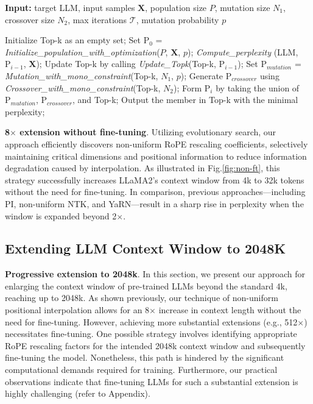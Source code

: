 \begin{algorithm}[t]
	\small
	\caption{The search algorithm}
	\textbf{Input:} target LLM, input samples $\mathbf{X}$, population size $P$, mutation size $N_1$, crossover size $N_2$, max iterations $\mathcal{T}$, mutation probability $p$\\

	\begin{algorithmic}[1]
		\label{alg:search}
		\STATE Initialize Top-k as an empty set;	
		\STATE Set $\text{P}_0$ = \textit{Initialize\_population\_with\_optimization}($P$, $\mathbf{X}$, $p$); 
		\STATE \textit{Compute\_perplexity} (LLM, $\text{P}_{i-1}$, $\mathbf{X}$);
		\STATE  Update Top-k by calling \textit{Update\_Topk}(Top-k, $\text{P}_{i-1}$);
		\STATE Set $\text{P}_{mutation}$ = \textit{Mutation\_with\_mono\_constraint}(Top-k, $N_1$, $p$); 
		\STATE Generate $\text{P}_{crossover}$ using \textit{Crossover\_with\_mono\_constraint}(Top-k, $N_2$);
		\STATE Form $\text{P}_i$ by taking the union of $\text{P}_{mutation}$, $\text{P}_{crossover}$, and Top-k;
		\ENDFOR
		\STATE Output the member in Top-k with the minimal perplexity;
	\end{algorithmic}
\end{algorithm}

\textbf{8$\times$ extension without fine-tuning}. Utilizing evolutionary search, our approach efficiently discovers non-uniform RoPE rescaling coefficients, selectively maintaining critical dimensions and positional information to reduce information degradation caused by interpolation. As illustrated in Fig.\ref{fig:non-ft}, this strategy successfully increases LLaMA2’s context window from 4k to 32k tokens without the need for fine-tuning. In comparison, previous approaches—including PI, non-uniform NTK, and YaRN—result in a sharp rise in perplexity when the window is expanded beyond 2$\times$.

\subsection{Extending LLM Context Window to 2048K}
\label{sec:extendto2048k}

\textbf{Progressive extension to 2048k}. In this section, we present our approach for enlarging the context window of pre-trained LLMs beyond the standard 4k, reaching up to 2048k. As shown previously, our technique of non-uniform positional interpolation allows for an 8$\times$ increase in context length without the need for fine-tuning. However, achieving more substantial extensions (e.g., 512$\times$) necessitates fine-tuning. One possible strategy involves identifying appropriate RoPE rescaling factors for the intended 2048k context window and subsequently fine-tuning the model. Nonetheless, this path is hindered by the significant computational demands required for training. Furthermore, our practical observations indicate that fine-tuning LLMs for such a substantial extension is highly challenging (refer to Appendix).

